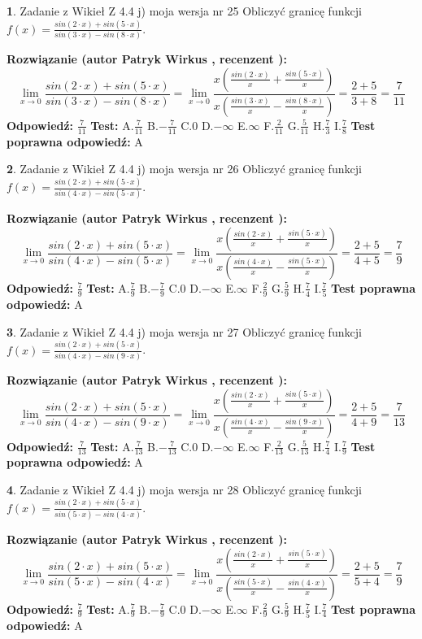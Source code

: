 \documentclass[12pt, a4paper]{article}
\theoremstyle{definition} %
\newtheorem{zad}{}
\newcommand{\zadStart}[1]{\begin{zad}#1\newline}
\newcommand{\zadStop}{\end{zad}}
\newcommand{\rozwStart}[2]{\noindent \textbf{Rozwiązanie (autor #1 , recenzent #2): }\newline}
\newcommand{\rozwStop}{\newline}
\newcommand{\odpStart}{\noindent \textbf{Odpowiedź:}\newline}
\newcommand{\odpStop}{\newline}
\newcommand{\testStart}{\noindent \textbf{Test:}\newline}
\newcommand{\testStop}{\newline}
\newcommand{\kluczStart}{\noindent \textbf{Test poprawna odpowiedź:}\newline}
\newcommand{\kluczStop}{\newline}
\begin{document}
\zadStart{Zadanie z Wikieł Z 4.4 j) moja wersja nr 25}
Obliczyć granicę funkcji $f(x)=\frac{sin(2\cdot x) +sin(5\cdot x)}{sin(3\cdot x) -sin(8\cdot x)}$.
\zadStop
\rozwStart{Patryk Wirkus}{}
$$\lim\limits_{x\to 0}\frac{sin(2\cdot x) +sin(5\cdot x)}{sin(3\cdot x) -sin(8\cdot x)}=\lim\limits_{x\to 0}\frac{x(\frac{sin(2\cdot x)}{x}+\frac{sin(5\cdot x)}{x})}{x(\frac{sin(3\cdot x)}{x}-\frac{sin(8\cdot x)}{x})}=\frac{2+5}{3+8} = \frac{7}{11}$$
\rozwStop
\odpStart
$\frac{7}{11}$
\odpStop
\testStart
A.$\frac{7}{11}$
B.$-\frac{7}{11}$
C.$0$
D.$-\infty$
E.$\infty$
F.$\frac{2}{11}$
G.$\frac{5}{11}$
H.$\frac{7}{3}$
I.$\frac{7}{8}$
\testStop
\kluczStart
A
\kluczStop



\zadStart{Zadanie z Wikieł Z 4.4 j) moja wersja nr 26}
Obliczyć granicę funkcji $f(x)=\frac{sin(2\cdot x) +sin(5\cdot x)}{sin(4\cdot x) -sin(5\cdot x)}$.
\zadStop
\rozwStart{Patryk Wirkus}{}
$$\lim\limits_{x\to 0}\frac{sin(2\cdot x) +sin(5\cdot x)}{sin(4\cdot x) -sin(5\cdot x)}=\lim\limits_{x\to 0}\frac{x(\frac{sin(2\cdot x)}{x}+\frac{sin(5\cdot x)}{x})}{x(\frac{sin(4\cdot x)}{x}-\frac{sin(5\cdot x)}{x})}=\frac{2+5}{4+5} = \frac{7}{9}$$
\rozwStop
\odpStart
$\frac{7}{9}$
\odpStop
\testStart
A.$\frac{7}{9}$
B.$-\frac{7}{9}$
C.$0$
D.$-\infty$
E.$\infty$
F.$\frac{2}{9}$
G.$\frac{5}{9}$
H.$\frac{7}{4}$
I.$\frac{7}{5}$
\testStop
\kluczStart
A
\kluczStop



\zadStart{Zadanie z Wikieł Z 4.4 j) moja wersja nr 27}
Obliczyć granicę funkcji $f(x)=\frac{sin(2\cdot x) +sin(5\cdot x)}{sin(4\cdot x) -sin(9\cdot x)}$.
\zadStop
\rozwStart{Patryk Wirkus}{}
$$\lim\limits_{x\to 0}\frac{sin(2\cdot x) +sin(5\cdot x)}{sin(4\cdot x) -sin(9\cdot x)}=\lim\limits_{x\to 0}\frac{x(\frac{sin(2\cdot x)}{x}+\frac{sin(5\cdot x)}{x})}{x(\frac{sin(4\cdot x)}{x}-\frac{sin(9\cdot x)}{x})}=\frac{2+5}{4+9} = \frac{7}{13}$$
\rozwStop
\odpStart
$\frac{7}{13}$
\odpStop
\testStart
A.$\frac{7}{13}$
B.$-\frac{7}{13}$
C.$0$
D.$-\infty$
E.$\infty$
F.$\frac{2}{13}$
G.$\frac{5}{13}$
H.$\frac{7}{4}$
I.$\frac{7}{9}$
\testStop
\kluczStart
A
\kluczStop



\zadStart{Zadanie z Wikieł Z 4.4 j) moja wersja nr 28}
Obliczyć granicę funkcji $f(x)=\frac{sin(2\cdot x) +sin(5\cdot x)}{sin(5\cdot x) -sin(4\cdot x)}$.
\zadStop
\rozwStart{Patryk Wirkus}{}
$$\lim\limits_{x\to 0}\frac{sin(2\cdot x) +sin(5\cdot x)}{sin(5\cdot x) -sin(4\cdot x)}=\lim\limits_{x\to 0}\frac{x(\frac{sin(2\cdot x)}{x}+\frac{sin(5\cdot x)}{x})}{x(\frac{sin(5\cdot x)}{x}-\frac{sin(4\cdot x)}{x})}=\frac{2+5}{5+4} = \frac{7}{9}$$
\rozwStop
\odpStart
$\frac{7}{9}$
\odpStop
\testStart
A.$\frac{7}{9}$
B.$-\frac{7}{9}$
C.$0$
D.$-\infty$
E.$\infty$
F.$\frac{2}{9}$
G.$\frac{5}{9}$
H.$\frac{7}{5}$
I.$\frac{7}{4}$
\testStop
\kluczStart
A
\kluczStop
\end{document}

